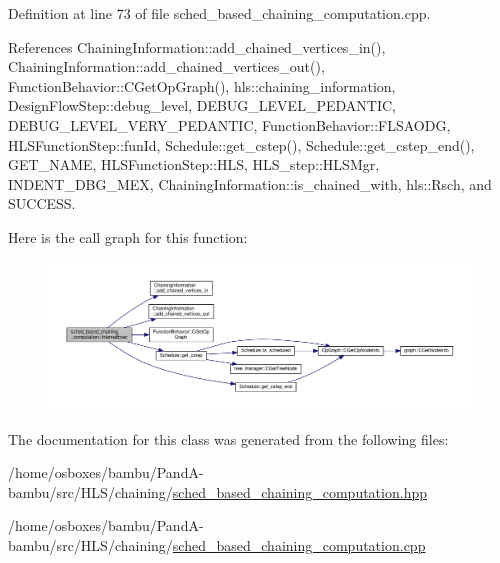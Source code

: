 Definition at line 73 of file sched\+\_\+based\+\_\+chaining\+\_\+computation.\+cpp.



References Chaining\+Information\+::add\+\_\+chained\+\_\+vertices\+\_\+in(), Chaining\+Information\+::add\+\_\+chained\+\_\+vertices\+\_\+out(), Function\+Behavior\+::\+C\+Get\+Op\+Graph(), hls\+::chaining\+\_\+information, Design\+Flow\+Step\+::debug\+\_\+level, D\+E\+B\+U\+G\+\_\+\+L\+E\+V\+E\+L\+\_\+\+P\+E\+D\+A\+N\+T\+IC, D\+E\+B\+U\+G\+\_\+\+L\+E\+V\+E\+L\+\_\+\+V\+E\+R\+Y\+\_\+\+P\+E\+D\+A\+N\+T\+IC, Function\+Behavior\+::\+F\+L\+S\+A\+O\+DG, H\+L\+S\+Function\+Step\+::fun\+Id, Schedule\+::get\+\_\+cstep(), Schedule\+::get\+\_\+cstep\+\_\+end(), G\+E\+T\+\_\+\+N\+A\+ME, H\+L\+S\+Function\+Step\+::\+H\+LS, H\+L\+S\+\_\+step\+::\+H\+L\+S\+Mgr, I\+N\+D\+E\+N\+T\+\_\+\+D\+B\+G\+\_\+\+M\+EX, Chaining\+Information\+::is\+\_\+chained\+\_\+with, hls\+::\+Rsch, and S\+U\+C\+C\+E\+SS.

Here is the call graph for this function\+:
\nopagebreak
\begin{figure}[H]
\begin{center}
\leavevmode
\includegraphics[width=350pt]{d7/d8d/classsched__based__chaining__computation_a9318a49e9ae291770e05f12c7dae246c_cgraph}
\end{center}
\end{figure}


The documentation for this class was generated from the following files\+:\begin{DoxyCompactItemize}
\item 
/home/osboxes/bambu/\+Pand\+A-\/bambu/src/\+H\+L\+S/chaining/\hyperlink{sched__based__chaining__computation_8hpp}{sched\+\_\+based\+\_\+chaining\+\_\+computation.\+hpp}\item 
/home/osboxes/bambu/\+Pand\+A-\/bambu/src/\+H\+L\+S/chaining/\hyperlink{sched__based__chaining__computation_8cpp}{sched\+\_\+based\+\_\+chaining\+\_\+computation.\+cpp}\end{DoxyCompactItemize}
